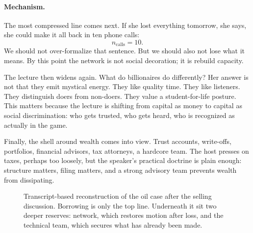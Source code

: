 \paragraph{Mechanism.}
The most compressed line comes next. If she lost everything tomorrow, she says, she could make it all back in ten phone calls:
\begin{equation}
n_{\text{calls}} = 10.
\end{equation}
We should not over-formalize that sentence. But we should also not lose what it means. By this point the network is not social decoration; it is rebuild capacity.

The lecture then widens again. What do billionaires do differently? Her answer is not that they emit mystical energy. They like quality time. They like listeners. They distinguish doers from non-doers. They value a student-for-life posture. This matters because the lecture is shifting from capital as money to capital as social discrimination: who gets trusted, who gets heard, who is recognized as actually in the game.

Finally, the shell around wealth comes into view. Trust accounts, write-offs, portfolios, financial advisors, tax attorneys, a hardcore team. The host presses on taxes, perhaps too loosely, but the speaker's practical doctrine is plain enough: structure matters, filing matters, and a strong advisory team prevents wealth from dissipating.

\begin{figure}[h]
\centering
{}
\caption{Transcript-based reconstruction of the oil case after the selling discussion. Borrowing is only the top line. Underneath it sit two deeper reserves: network, which restores motion after loss, and the technical team, which secures what has already been made.}
\end{figure}

